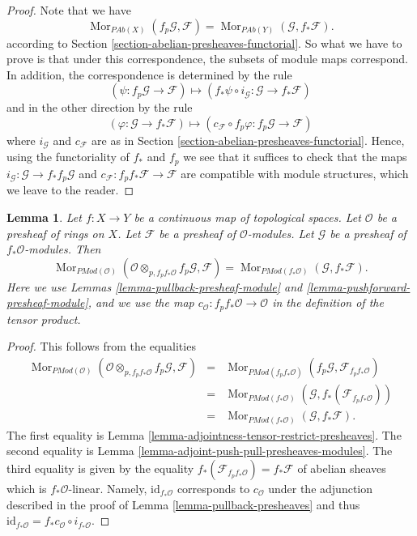\documentclass{stacks-project}
\theoremstyle{plain}
\newtheorem{lemma}[subsection]{Lemma}
\theoremstyle{definition}
\theoremstyle{remark}
\numberwithin{equation}{subsection}
\def\Mor{\mathop{\mathrm{Mor}}\nolimits}
\begin{document}
\begin{proof}
Note that we have
$$
\Mor_{\textit{PAb}(X)}(f_p\mathcal{G}, \mathcal{F})
=
\Mor_{\textit{PAb}(Y)}(\mathcal{G}, f_*\mathcal{F}).
$$
according to Section \ref{section-abelian-presheaves-functorial}.
So what we have to prove is that under this correspondence, the
subsets of module maps correspond. In addition, the correspondence
is determined by the rule
$$
(\psi : f_p\mathcal{G} \to \mathcal{F})
\longmapsto
(f_*\psi \circ i_\mathcal{G} :
\mathcal{G} \to f_* \mathcal{F})
$$
and in the other direction by the rule
$$
(\varphi : \mathcal{G} \to f_* \mathcal{F})
\longmapsto
(c_\mathcal{F} \circ f_p\varphi : f_p\mathcal{G} \to \mathcal{F})
$$
where $i_\mathcal{G}$ and $c_\mathcal{F}$ are as in
Section \ref{section-abelian-presheaves-functorial}.
Hence, using the functoriality of $f_*$ and $f_p$ we see that
it suffices to check that the maps
$i_\mathcal{G} : \mathcal{G} \to f_* f_p \mathcal{G}$ and
$c_\mathcal{F} : f_p f_* \mathcal{F} \to \mathcal{F}$
are compatible with module structures, which we leave to the reader.
\end{proof}

\begin{lemma}
\label{lemma-adjoint-pull-push-presheaves-modules}
Let $f : X \to Y$ be a continuous map of topological spaces.
Let $\mathcal{O}$ be a presheaf of rings on $X$.
Let $\mathcal{F}$ be a presheaf of $\mathcal{O}$-modules.
Let $\mathcal{G}$ be a presheaf of $f_*\mathcal{O}$-modules.
Then
$$
\Mor_{\textit{PMod}(\mathcal{O})}(
\mathcal{O} \otimes_{p, f_pf_*\mathcal{O}} f_p\mathcal{G}, \mathcal{F})
=
\Mor_{\textit{PMod}(f_*\mathcal{O})}(\mathcal{G}, f_*\mathcal{F}).
$$
Here we use
Lemmas \ref{lemma-pullback-presheaf-module}
and \ref{lemma-pushforward-presheaf-module}, and we use
the map $c_\mathcal{O} : f_pf_*\mathcal{O} \to \mathcal{O}$
in the definition of the tensor product.
\end{lemma}

\begin{proof}
This follows from the equalities
\begin{eqnarray*}
\Mor_{\textit{PMod}(\mathcal{O})}(
\mathcal{O} \otimes_{p, f_pf_*\mathcal{O}} f_p\mathcal{G}, \mathcal{F})
& = &
\Mor_{\textit{PMod}(f_pf_*\mathcal{O})}(
f_p\mathcal{G}, \mathcal{F}_{f_pf_*\mathcal{O}}) \\
& = &
\Mor_{\textit{PMod}(f_*\mathcal{O})}(\mathcal{G},
f_*(\mathcal{F}_{f_pf_*\mathcal{O}})) \\
& = &
\Mor_{\textit{PMod}(f_*\mathcal{O})}(\mathcal{G}, f_*\mathcal{F}).
\end{eqnarray*}
The first equality is
Lemma \ref{lemma-adjointness-tensor-restrict-presheaves}.
The second equality is
Lemma \ref{lemma-adjoint-push-pull-presheaves-modules}.
The third equality is given by the equality
$f_*(\mathcal{F}_{f_pf_*\mathcal{O}}) = f_*\mathcal{F}$
of abelian sheaves which is $f_*\mathcal{O}$-linear. Namely,
$\text{id}_{f_*\mathcal{O}}$ corresponds to $c_\mathcal{O}$
under the adjunction described in the proof of
Lemma \ref{lemma-pullback-presheaves}
and thus
$\text{id}_{f_*\mathcal{O}} = f_*c_\mathcal{O} \circ i_{f_*\mathcal{O}}$.
\end{proof}
\end{document}
